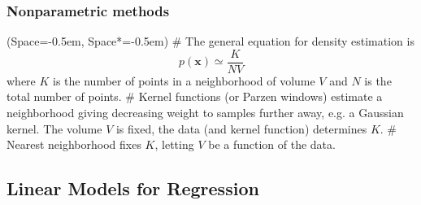 \documentclass[12pt, a4paper]{article}
\newcommand{\listSpace}{-0.5em}%
\newcommand{\vect}[1]{\bm{#1}}
\begin{document}
\subsubsection*{Nonparametric methods}
\begin{easylist}[itemize]
	\ListProperties(Space=\listSpace, Space*=\listSpace)
	# The general equation for density estimation is
	\begin{equation*}
	p(\vect{x}) \simeq \frac{K}{NV}
	\end{equation*}
	where $K$ is the number of points in a neighborhood of volume $V$ and $N$ is the total number of points.
	# Kernel functions (or Parzen windows) estimate a neighborhood giving decreasing weight to samples further away, e.g. a Gaussian kernel.
	The volume $V$ is fixed, the data (and kernel function) determines $K$.
	# Nearest neighborhood fixes $K$, letting $V$ be a function of the data.
\end{easylist}

\subsection{Linear Models for Regression}
\end{document}
